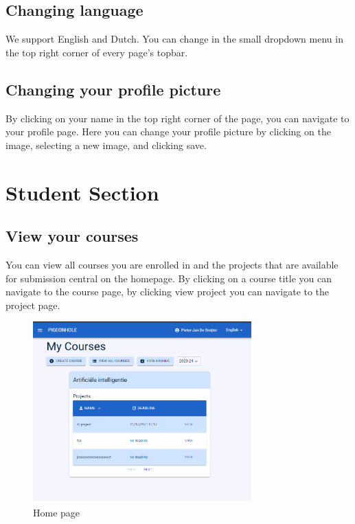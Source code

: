 \documentclass{article}
\begin{document}
\subsection{Changing language}
We support English and Dutch. You can change in the small dropdown menu in the top right corner of every page's topbar.

\subsection{Changing your profile picture}
By clicking on your name in the top right corner of the page, you can navigate to your profile page. Here you can change your profile picture by clicking on the image, selecting a new image, and clicking save.

\section{Student Section}

\subsection{View your courses}

You can view all courses you are enrolled in and the projects that are available for submission central on the homepage. By clicking on a course title you can navigate to the course page, by clicking view project you can navigate to the project page.

\begin{figure}[H]
    \centering
    \includegraphics[width=0.75\textwidth]{images/studentpage.png}
    \caption{Home page}
\end{figure}
\end{document}
